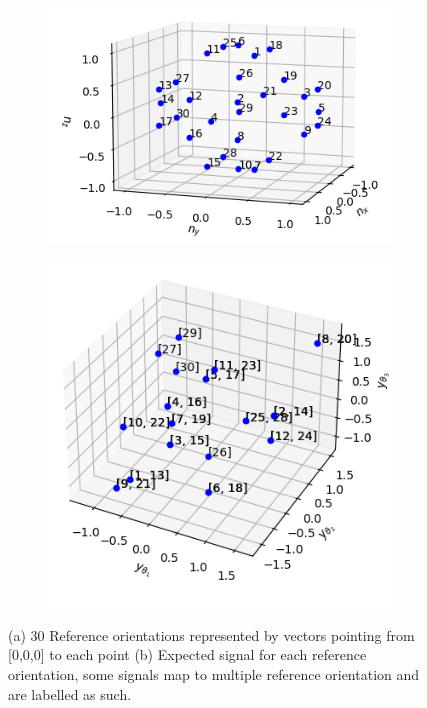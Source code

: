 \documentclass[final,  3p]{elsarticle}
\begin{document}
\begin{figure}[h]
	\centering
	\begin{subfigure}{0.49\textwidth}
		\subcaption{}
		\includegraphics[width=\textwidth]{./Images/fig2b.png}
	\end{subfigure}
	\begin{subfigure}{0.4\textwidth}
		\subcaption{}
		\includegraphics[width=\textwidth]{./Images/intensity_space.png}
	\end{subfigure}
	\caption{(a) 30 Reference orientations represented by vectors pointing from [0,0,0] to each point (b) Expected signal for each reference orientation, some signals map to multiple reference orientation and are labelled as such.}
	\label{fig:angles}
\end{figure}
\end{document}
